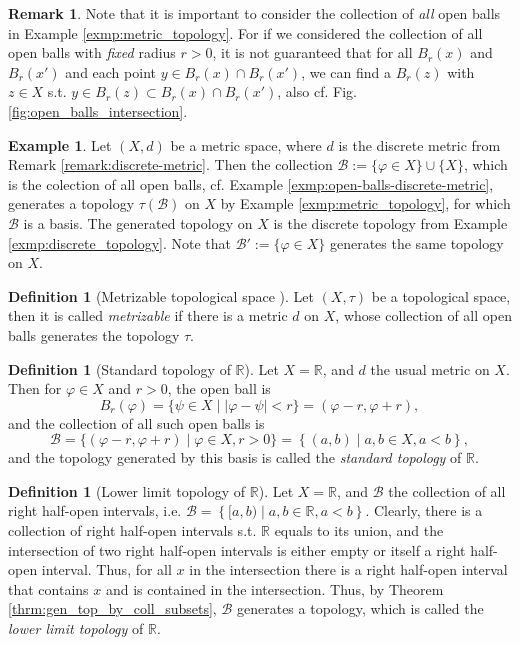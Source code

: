 \documentclass[12pt, a4paper]{article}
\numberwithin{equation}{section}
\theoremstyle{definition}
\theoremstyle{definition}
\newtheorem{defn}[thm]{Definition} %
\newtheorem{exmp}[thm]{Example} %
\newtheorem{remark}[thm]{Remark} %
\newcommand{\abs}[1]{\left\vert #1 \right\vert}
\begin{document}
		\begin{remark}
			Note that it is important to consider the collection of \textit{all} open balls in Example \ref{exmp:metric_topology}. For if we considered the collection of all open balls with \textit{fixed} radius $r > 0$, it is not guaranteed that for all $B_{r}(x)$ and $B_{r}(x')$ and each point $y\in B_{r}(x)\cap B_{r}(x')$, we can find a $B_{r}(z)$ with $z\in X$ s.t. $y\in B_{r}(z)\subset B_{r}(x)\cap B_{r}(x')$, also cf. Fig. \ref{fig:open_balls_intersection}.
		\end{remark}
		
		\begin{exmp}\label{exmp:basis_discrete_metric}
			Let $(X, d)$ be a metric space, where $d$ is the discrete metric from Remark \ref{remark:discrete-metric}. Then the collection $\mathscr B := \{\varphi\in X\}\cup \{X\}$, which is the colection of all open balls, cf. Example \ref{exmp:open-balls-discrete-metric}, generates a topology $\tau(\mathscr B)$ on $X$ by Example \ref{exmp:metric_topology}, for which $\mathscr B$ is a basis. The generated topology on $X$ is the discrete topology from Example \ref{exmp:discrete_topology}. Note that $\mathscr B' := \{\varphi\in X\}$ generates the same topology on $X$.
		\end{exmp}

		\begin{defn}[Metrizable topological space \cite{topology-singh}]
			Let $(X, \tau)$ be a topological space, then it is called \textit{metrizable} if there is a metric $d$ on $X$, whose collection of all open balls generates the topology $\tau$.
		\end{defn}

		\begin{defn}[Standard topology of $\mathbb R$]\label{defn:standard_topology}
			Let $X = \mathbb R$, and $d$ the usual metric on $X$. Then for $\varphi\in X$ and $r > 0$, the open ball is $$B_{r}(\varphi) = \{ \psi\in X\mid \abs{\varphi - \psi} < r \} = (\varphi - r, \varphi + r),$$ and the collection of all such open balls is $$\mathscr B = \{(\varphi - r, \varphi + r) \mid \varphi\in X, r > 0\} = \left\{(a, b) \mid a, b\in X, a < b\right\},$$
			and the topology generated by this basis is called the \textit{standard topology} of $\mathbb R$.
		\end{defn}
	
		\begin{defn}[Lower limit topology of $\mathbb R$]
			Let $X = \mathbb R$, and $\mathscr B$ the collection of all right half-open intervals, i.e. $\mathscr B= \left\{ [a, b) \mid a, b\in\mathbb R, a < b \right\}$. Clearly, there is a collection of right half-open intervals s.t. $\mathbb R$ equals to its union, and the intersection of two right half-open intervals is either empty or itself a right half-open interval. Thus, for all $x$ in the intersection there is a right half-open interval that contains $x$ and is contained in the intersection. Thus, by Theorem \ref{thrm:gen_top_by_coll_subsets}, $\mathscr B$ generates a topology, which is called the \textit{lower limit topology} of $\mathbb R$.
		\end{defn}
	
\end{document}
